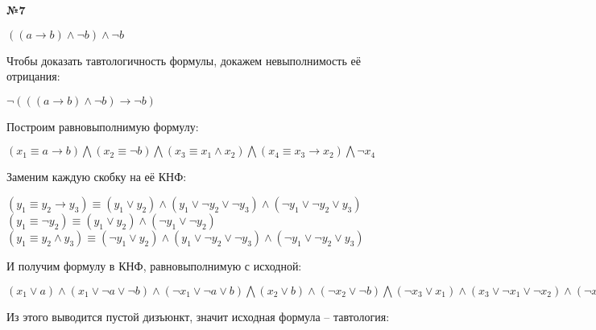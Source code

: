 \documentclass{article}
\newenvironment{task}{\begin{center}\fontsize{14}{14}\selectfont\bf}{\rm\fontsize{12}{12}\selectfont\end{center}}
\begin{document}
	
	
	
			
	
	\begin{task} 
		№7
	\end{task}
	\begin{center}
		$((a \rightarrow b) \wedge \neg b) \wedge \neg b$
	\end{center}
	Чтобы доказать тавтологичность формулы, докажем невыполнимость её отрицания:
	\begin{center}
		$\neg (((a \rightarrow b) \wedge \neg b) \rightarrow \neg b)$
	\end{center}
	Построим равновыполнимую формулу:
	\begin{center}
		$(x_1 \equiv a \rightarrow b) \bigwedge (x_2 \equiv \neg b) \bigwedge (x_3 \equiv x_1 \wedge x_2) \bigwedge (x_4 \equiv x_3 \rightarrow x_2) \bigwedge \neg x_4$\\\vspace{5px}
	\end{center}
	Заменим каждую скобку на её КНФ:
	\begin{center}
		$(y_1 \equiv y_2 \rightarrow y_3) \equiv (y_1 \vee y_2) \wedge (y_1 \vee \neg y_2 \vee \neg y_3) \wedge (\neg y_1 \vee \neg y_2 \vee y_3) $\\\vspace{5px}
		$(y_1 \equiv \neg y_2) \equiv (y_1 \vee y_2) \wedge (\neg y_1 \vee\neg y_2)$\\\vspace{5px}
		$(y_1 \equiv y_2 \wedge y_3) \equiv (\neg y_1 \vee y_2) \wedge (y_1 \vee \neg y_2 \vee \neg y_3) \wedge (\neg y_1 \vee \neg y_2 \vee y_3)$
	\end{center}
	И получим формулу в КНФ, равновыполнимую с исходной:
	\begin{center}
		$(x_1 \vee a) \wedge (x_1 \vee \neg a \vee \neg b) \wedge (\neg x_1 \vee \neg a \vee b) \bigwedge 
		(x_2 \vee b) \wedge (\neg x_2 \vee\neg b) \bigwedge 
		(\neg x_3 \vee x_1) \wedge (x_3 \vee \neg x_1 \vee \neg x_2) \wedge (\neg x_3 \vee \neg x_1 \vee x_2) \bigwedge 
		(x_4 \vee x_3) \wedge (x_4 \vee \neg x_3 \vee \neg x_2) \wedge (\neg x_4 \vee \neg x_3 \vee x_2) \bigwedge 
		\neg x_4$\\\vspace{5px}
	\end{center}
	Из этого выводится пустой дизъюнкт, значит исходная формула -- тавтология:
\end{document}
